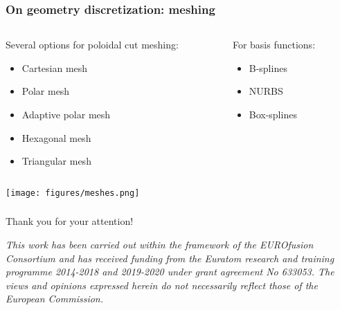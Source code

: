 \documentclass[10pt]{beamer}
\begin{document}
\begin{frame}
\frametitle{On geometry discretization: meshing}


\begin{columns}
\begin{column}{0.6\textwidth}
Several options for poloidal cut meshing:

\begin{itemize}
	\item Cartesian mesh
	\item Polar mesh
	\item Adaptive polar mesh
	\item Hexagonal mesh
	\item Triangular mesh
\end{itemize}

\end{column}
\begin{column}{0.4\textwidth}

For basis functions:

\begin{itemize}
	\item B-splines
	\item NURBS
	\item Box-splines
\end{itemize}
\end{column}
\end{columns}



\begin{center}
	\texttt{[image: figures/meshes.png]}
\end{center}
\vspace{-0.5cm}
\end{frame}




\begin{frame}
\frametitle{}
{\centering
{\Huge Thank you for your attention!}}
\vspace{3cm}

{\footnotesize \emph{ This work has been carried out within the framework of the EUROfusion Consortium and has received funding from the Euratom research and training programme 2014-2018 and 2019-2020 under grant agreement No 633053. The views and opinions expressed herein do not necessarily reflect those of the European Commission.}}
\end{frame}
\end{document}
